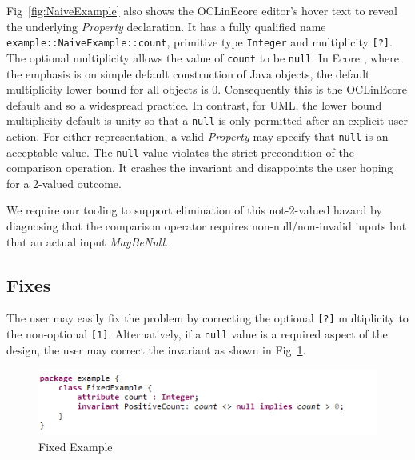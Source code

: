 \documentclass[
]{ceurart}
\begin{document}
Fig~\ref{fig:NaiveExample} also shows the OCLinEcore editor's hover text to
reveal the underlying \emph{Property} declaration. It has a fully qualified name \verb|example::NaiveExample::count|, primitive type \verb|Integer| and multiplicity \verb|[?]|. The optional multiplicity allows the value of \verb|count| to be \verb|null|. In Ecore \cite{EMF}, where the emphasis is on simple default construction of Java objects, the default multiplicity lower bound for all objects is 0. Consequently this is the OCLinEcore default and so a widespread practice. In contrast, for UML, the lower bound multiplicity default is unity so that a \verb|null| is only permitted after an explicit user action. For either representation, a valid \emph{Property} may specify that \verb|null| is an acceptable value. The \verb|null| value violates the strict precondition of the comparison operation. It crashes the invariant and disappoints the user hoping for a 2-valued outcome.

We require our tooling to support elimination of this not-2-valued hazard by diagnosing that the comparison operator requires non-null/non-invalid inputs but that an actual input \emph{MayBeNull}.

\subsection{Fixes}

The user may easily fix the problem by correcting the optional \verb|[?]| multiplicity to the non-optional \verb|[1]|. Alternatively, if a \verb|null| value is a required aspect of the design, the user may correct the invariant as shown in Fig~\ref{fig:FixedExample}.

\begin{figure}
	\vspace{-10pt}
	\begin{center}
		\includegraphics[width=6.0in]{FixedExample.png}
	\end{center}
	\vspace{-10pt}
	\caption{Fixed Example}
	\label{fig:FixedExample}
	\vspace{-10pt}
\end{figure}
\end{document}
